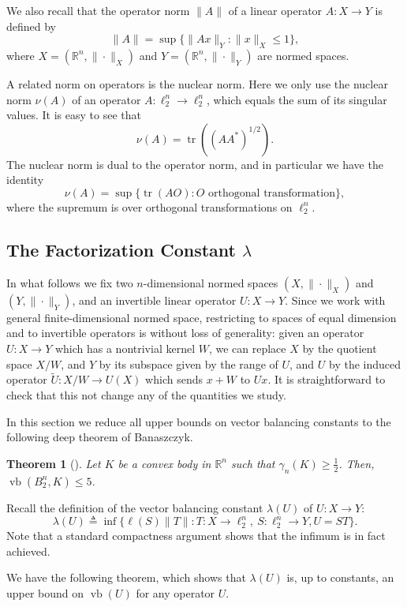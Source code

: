 \documentclass[11pt]{article}
\newtheorem{theorem}{Theorem}
\newcommand{\R}{{\mathbb{R}}}
\newcommand{\eqdef}{\triangleq}
\DeclareMathOperator{\vb}{vb}
\DeclareMathOperator{\tr}{tr}
\begin{document}
We also recall that the operator norm $\|A\|$ of a linear operator
$A:X \to Y$ is defined by 
\[
\|A\| = \sup\{\|Ax\|_Y: \|x\|_X \le 1\},
\]
where $X = (\R^n, \|\cdot\|_X)$ and $Y = (\R^n, \|\cdot\|_Y)$ are
normed spaces. 

A related norm on operators is the nuclear norm. Here we only use the
nuclear norm $\nu(A)$ of an operator $A:\ell_2^n \to \ell_2^n$, which
equals the sum of its singular values. It is easy to see that
\[
\nu(A) = \tr((AA^*)^{1/2}).
\]
The nuclear norm is dual to the operator norm, and in particular we
have the identity
\[
\nu(A) = \sup\{\tr(AO): O \text{ orthogonal transformation}\},
\]
where the supremum is over orthogonal transformations on $\ell_2^n$. 


\subsection{The Factorization Constant $\lambda$}

In what follows we fix two $n$-dimensional normed spaces $(X,
\|\cdot\|_X)$ and $(Y,\|\cdot\|_Y)$, and an invertible linear operator
$U:X \to Y$. Since we work with general finite-dimensional normed
space, restricting to spaces of equal dimension and to invertible
operators is without loss of generality: given an operator $U:X \to Y$
which has a nontrivial kernel $W$, we can replace $X$ by the
quotient space $X/W$, and $Y$ by its subspace given by the range of
$U$, and $U$ by the induced operator $\tilde{U}:X/W \to U(X)$ which
sends $x+W$ to $Ux$. It is straightforward to check that this not
change any of the quantities we study.

In this section we reduce all upper bounds on vector balancing
constants to the following deep theorem of Banaszczyk.
\begin{theorem}[\cite{bana}]\label{thm:bana}
  Let $K$ be a convex body in $\R^n$ such that $\gamma_n(K) \ge
  \frac12$. Then, $\vb(B_2^n, K) \le 5$.
\end{theorem}

Recall the definition of the vector balancing constant $\lambda(U)$ of
$U:X \to Y$: 
\[
\lambda(U) \eqdef \inf \{\ell(S)\|T\|: T: X \to \ell_2^n,\ S: \ell_2^n
\to Y, U = ST\}.
\]
Note that a standard compactness argument shows that the infimum is in fact achieved. 

We have the following theorem, which shows that $\lambda(U)$ is, up to
constants, an upper bound on $\vb(U)$ for any operator $U$. 
\end{document}
